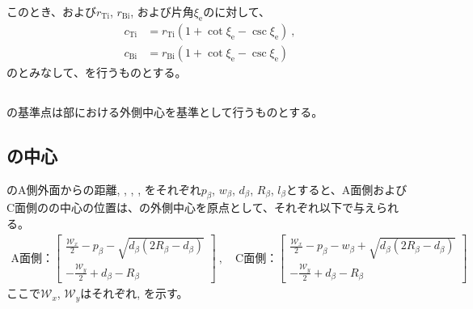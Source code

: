 このとき、\TopEndFaceInRChamferRadius および\BottomEndFaceInRChamferRadius$r_\mathrm{Ti}$, $r_\mathrm{Bi}$, および片角$\xi_\mathrm e$の\TaperEndMill に対して、
\begin{align*}
  c_\mathrm{Ti} &= r_\mathrm{Ti}\left(1+\cot\xi_\mathrm e-\csc\xi_\mathrm e\right)\ ,\\
  c_\mathrm{Bi} &= r_\mathrm{Bi}\left(1+\cot\xi_\mathrm e-\csc\xi_\mathrm e\right)
\end{align*}
の\EndFaceCChamferLength とみなして、\EndFaceInCChamferMilling を行うものとする。



\clearpage


\subsection{\EndFaceBoringMillingReferencePoint}
\EndFaceBoringMilling の基準点は\TopEndFace 部における外側中心を基準として行うものとする。


\subsection{\EndFaceBoringCornerR の中心}
\EndFaceBoring のA側外面からの距離, \EndFaceBoringWidth, \EndFaceBoringDepth, \EndFaceBoringCornerR, \EndFaceBoringLength をそれぞれ$p_\beta$, $w_\beta$, $d_\beta$, $R_\beta$, $l_\beta$とすると、A面側およびC面側の\EndFaceBoringCornerR の中心の位置は、\TopEndFace の外側中心を原点として、それぞれ以下で与えられる。
\begin{align*}
  \text{A面側：}
  \left[
  \begin{array}{c}
  \displaystyle
  \frac{\mathcal W_x}2-p_\beta-\sqrt{d_\beta(2R_\beta-d_\beta)}\\[8pt]
  \displaystyle
  -\frac{\mathcal W_y}2+d_\beta-R_\beta
  \end{array}
  \right]~,\quad
  \text{C面側：}
  \left[
  \begin{array}{c}
  \displaystyle
  \frac{\mathcal W_x}2-p_\beta-w_\beta+\sqrt{d_\beta(2R_\beta-d_\beta)}\\[8pt]
  \displaystyle
  -\frac{\mathcal W_y}2+d_\beta-R_\beta
  \end{array}
  \right]
\end{align*}
ここで$\mathcal W_x$, $\mathcal W_y$はそれぞれ\TopEndACOD, \TopEndBDOD を示す。


